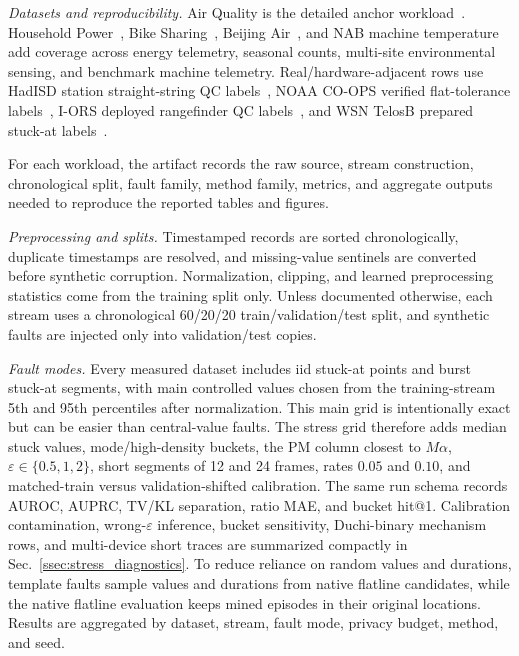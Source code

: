 \documentclass[conference]{IEEEtran}
\begin{document}
\noindent\emph{Datasets and reproducibility.}
Air Quality is the detailed anchor workload~\cite{vito2008airqualityuci,devito2008benzene}. Household Power~\cite{uci_household_power}, Bike Sharing~\cite{uci_bike_sharing,fanaee2014event}, Beijing Air~\cite{uci_beijing_multisite,zhang2017cautionary}, and NAB machine temperature~\cite{numenta_nab,ahmad2017nab} add coverage across energy telemetry, seasonal counts, multi-site environmental sensing, and benchmark machine telemetry. Real/hardware-adjacent rows use HadISD station straight-string QC labels~\cite{dunn2016hadisd}, NOAA CO-OPS verified flat-tolerance labels~\cite{noaa_coops_verified_erddap,noaa_coops_qc_requirements}, I-ORS deployed rangefinder QC labels~\cite{jeong2025iorsslh}, and WSN TelosB prepared stuck-at labels~\cite{zidi2018wsnsvm}.

For each workload, the artifact records the raw source, stream construction, chronological split, fault family, method family, metrics, and aggregate outputs needed to reproduce the reported tables and figures.

\noindent\emph{Preprocessing and splits.}
Timestamped records are sorted chronologically, duplicate timestamps are resolved, and missing-value sentinels are converted before synthetic corruption. Normalization, clipping, and learned preprocessing statistics come from the training split only. Unless documented otherwise, each stream uses a chronological 60/20/20 train/validation/test split, and synthetic faults are injected only into validation/test copies.

\noindent\emph{Fault modes.}
Every measured dataset includes iid stuck-at points and burst stuck-at segments, with main controlled values chosen from the training-stream 5th and 95th percentiles after normalization. This main grid is intentionally exact but can be easier than central-value faults. The stress grid therefore adds median stuck values, mode/high-density buckets, the PM column closest to \(M\alpha\), \(\varepsilon\in\{0.5,1,2\}\), short segments of 12 and 24 frames, rates \(0.05\) and \(0.10\), and matched-train versus validation-shifted calibration. The same run schema records AUROC, AUPRC, TV/KL separation, ratio MAE, and bucket hit@1. Calibration contamination, wrong-\(\varepsilon\) inference, bucket sensitivity, Duchi-binary mechanism rows, and multi-device short traces are summarized compactly in Sec.~\ref{ssec:stress_diagnostics}. To reduce reliance on random values and durations, template faults sample values and durations from native flatline candidates, while the native flatline evaluation keeps mined episodes in their original locations. Results are aggregated by dataset, stream, fault mode, privacy budget, method, and seed.
\end{document}
